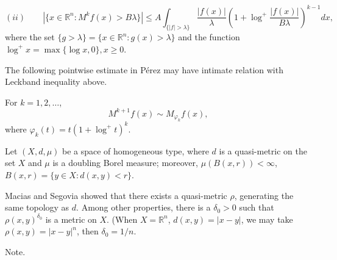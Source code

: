 \documentclass[12pt]{article}
\def\vphi{\varphi}
\def\lam{\lambda}
\begin{document}
$$  
(ii) \qquad |\{ x\in \mathbb{R}^n: M^k f(x)>B \lam  \} | \le
A\int_{\{|f|>\lam  \} } \frac{|f(x)|}{\lam } (1+ \log^+\frac{|f(x)|}{B\lam }  )^{k-1}dx, 
$$
where the set $\{ g>\lam \} =\{ x\in \mathbb{R}^n: g(x)>\lam \}$ and
the function $ \log^+ x = \max\{\log x,0 \}, x\ge 0  $.

\vspace{0.2in}

The following pointwise estimate in P\'erez\cite{Perez} may have intimate relation with
Leckband inequality above.

For $k=1,2,\dots$, 
$$  M^{k+1} f(x) \sim  M_{\vphi_k } f(x),$$
where $ \vphi_k(t)= t(1+\log^+t)^k $.


\vspace{.4in}

Let $(X,d, \mu)$ be a space of homogeneous type, where $d$ is a
quasi-metric on the set $X$ and $\mu$ is a doubling Borel measure;
moreover, $\mu(B(x,r))<\infty$, $ B(x,r)=\{y\in X: d(x,y)<r \} $.  

Macias and Segovia showed that there exists a quasi-metric $\rho$,
generating the same topology as $d$. Among other properties,
there is a $\delta_0>0$ such that $\rho (x,y)^{\delta_0} $ is a metric
on $X$. (When $X=\mathbb{R}^n$, $d(x,y)=|x-y|$, we may take $\rho (x,y)=|x-y|^n$,
then $\delta_0 =1/n$.


Note.
%  
\end{document}
